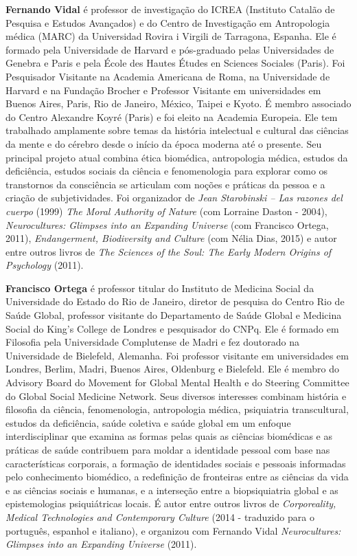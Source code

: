 \textbf{Fernando Vidal} é professor de investigação do ICREA (Instituto
Catalão de Pesquisa e Estudos Avançados) e do Centro de Investigação em
Antropologia médica (MARC) da Universidad Rovira i Virgili de Tarragona,
Espanha. Ele é formado pela Universidade de Harvard e pós-graduado pelas
Universidades de Genebra e Paris e pela École des Hautes Études en
Sciences Sociales (Paris). Foi Pesquisador Visitante na Academia
Americana de Roma, na Universidade de Harvard e na Fundação Brocher e
Professor Visitante em universidades em Buenos Aires, Paris, Rio de
Janeiro, México, Taipei e Kyoto. É membro associado do Centro Alexandre
Koyré (Paris) e foi eleito na Academia Europeia. Ele tem trabalhado
amplamente sobre temas da história intelectual e cultural das ciências
da mente e do cérebro desde o início da época moderna até o presente.
Seu principal projeto atual combina ética biomédica, antropologia
médica, estudos da deficiência, estudos sociais da ciência e
fenomenologia para explorar como os transtornos da consciência se
articulam com noções e práticas da pessoa e a criação de subjetividades.
Foi organizador de \emph{Jean Starobinski -- Las razones del cuerpo}
(1999) \emph{The Moral Authority of Nature} (com Lorraine Daston -
2004), \emph{Neurocultures: Glimpses into an Expanding Universe }(com
Francisco Ortega, 2011), \emph{Endangerment, Biodiversity and
Culture} (com Nélia Dias, 2015) e autor entre outros livros de \emph{The
Sciences of the Soul: The Early Modern Origins of Psychology} (2011).

\textbf{Francisco Ortega} é professor titular do Instituto de Medicina
Social da Universidade do Estado do Rio de Janeiro, diretor de pesquisa
do Centro Rio de Saúde Global, professor visitante do Departamento de
Saúde Global e Medicina Social do King's College de Londres e
pesquisador do CNPq. Ele é formado em Filosofia pela Universidade
Complutense de Madri e fez doutorado na Universidade de Bielefeld,
Alemanha. Foi professor visitante em universidades em Londres, Berlim,
Madri, Buenos Aires, Oldenburg e Bielefeld. Ele é membro do Advisory
Board do Movement for Global Mental Health e do Steering Committee do
Global Social Medicine Network. Seus diversos interesses combinam
história e filosofia da ciência, fenomenologia, antropologia médica,
psiquiatria transcultural, estudos da deficiência, saúde coletiva e
saúde global em um enfoque interdisciplinar que examina as formas pelas
quais as ciências biomédicas e as práticas de saúde contribuem para
moldar a identidade pessoal com base nas características corporais, a
formação de identidades sociais e pessoais informadas pelo conhecimento
biomédico, a redefinição de fronteiras entre as ciências da vida e as
ciências sociais e humanas, e a interseção entre a biopsiquiatria global
e as epistemologias psiquiátricas locais. É autor entre outros livros de
\emph{Corporeality, Medical Technologies and Contemporary Culture} (2014
- traduzido para o português, espanhol e italiano), e organizou com
Fernando Vidal \emph{Neurocultures: Glimpses into an Expanding Universe}
(2011).

